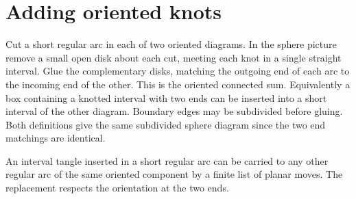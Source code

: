 \section{Adding oriented knots}
\label{sec:sums}
Cut a short regular arc in each of two oriented diagrams. In the sphere picture remove a small open disk about each cut, meeting each knot in a single straight interval. Glue the complementary disks, matching the outgoing end of each arc to the incoming end of the other. This is the oriented connected sum. Equivalently a box containing a knotted interval with two ends can be inserted into a short interval of the other diagram. Boundary edges may be subdivided before gluing. Both definitions give the same subdivided sphere diagram since the two end matchings are identical.

\begin{lemma}
An interval tangle inserted in a short regular arc can be carried to any other regular arc of the same oriented component by a finite list of planar moves. The replacement respects the orientation at the two ends.
\end{lemma}
